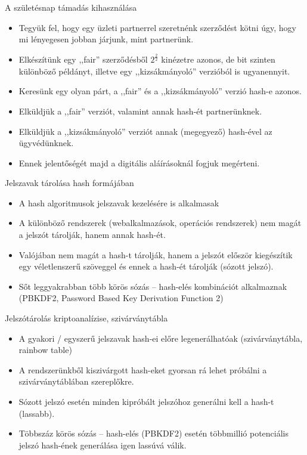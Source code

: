 \documentclass[12 pt]{beamer}
\begin{document}
\begin{frame}{A születésnap támadás kihasználása}
  \begin{itemize}
    \item{Tegyük fel, hogy egy üzleti partnerrel szeretnénk szerződést kötni úgy, hogy mi lényegesen jobban járjunk, mint partnerünk.}
    \item{Elkészítünk egy ,,fair'' szerződésből $2^\frac{2}{2}$ kinézetre azonos, de bit szinten különböző példányt, illetve egy ,,kizsákmányoló'' verzióból is ugyanennyit.}
    \item{Keresünk egy olyan párt, a ,,fair'' és a ,,kizsákmányoló'' verzió hash-e azonos.}
    \item{Elküldjük a ,,fair'' verziót, valamint annak hash-ét partnerünknek.}
    \item{Elküldjük a ,,kizsákmányoló'' verziót annak (megegyező) hash-ével az ügyvédünknek.}
    \item{Ennek jelentőségét majd a digitális aláírásoknál fogjuk megérteni.}
  \end{itemize}
\end{frame}

\begin{frame}{Jelszavak tárolása hash formájában}
  \begin{itemize}
    \item{A hash algoritmusok jelszavak kezelésére is alkalmasak}
    \item{A különböző rendszerek (webalkalmazások, operációs rendszerek) nem magát a jelszót tárolják, hanem annak hash-ét.}
    \item{Valójában nem magát a hash-t tárolják, hanem a jelszót először kiegészítik egy véletlenszerű szöveggel és ennek a hash-ét tárolják (sózott jelszó).}
    \item{Sőt leggyakrabban több körös sózás -- hash-elés kombinációt alkalmaznak (PBKDF2, Password Based Key Derivation Function 2)}
  \end{itemize}
\end{frame}

\begin{frame}{Jelszótárolás kriptoanalízise, szivárványtábla}
  \begin{itemize}
    \item{A gyakori / egyszerű jelszavak hash-ei előre legenerálhatóak (szivárványtábla, rainbow table)}
    \item{A rendszerünkből kiszivárgott hash-eket gyorsan rá lehet próbálni a szivárványtáblában szereplőkre.}
    \item{Sózott jelszó esetén minden kipróbált jelszóhoz generálni kell a hash-t (lassabb).}
    \item{Többszáz körös sózás -- hash-elés (PBKDF2) esetén többmillió potenciális jelszó hash-ének generálása igen lassúvá válik.}
  \end{itemize}
\end{frame}

\end{document}
